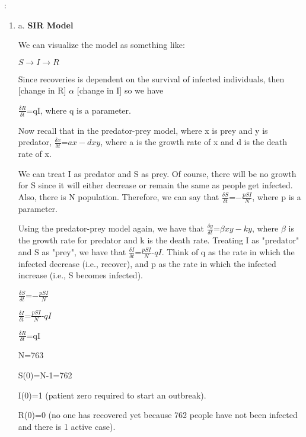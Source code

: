 \documentclass[12pt]{amsart}
\newcounter{probnum}
\newenvironment{prob}{\begin{enumerate}\setcounter{enumi}{\value{probnum}}}%
 {\setcounter{probnum}{\value{enumi}}\end{enumerate}}
\begin{document}
 :  

\begin{prob}
  
  \bigskip 
  
  \item[a.] {\bf SIR Model}
  
  \noindent We can visualize the model as something like:
  
  \noindent $S \rightarrow I \rightarrow R$
  
  \noindent Since recoveries is dependent on the survival of infected individuals, then [change in R] $\alpha$ [change in I] so  we have
  
  \noindent $\frac{\delta R}{\delta t}$=qI, where q is a parameter.
  
  \noindent Now recall that in the predator-prey model, where x is prey and y is predator, $\frac{\delta x}{\delta t}$=$ax-dxy$, where a is the growth rate of x and d is the death rate of x.
  
  \noindent We can treat I as predator and S as prey. Of course, there will be no growth for S since it will either decrease or remain the same as people get infected. Also, there is N population. Therefore, we can say that $\frac{\delta S}{\delta t}$=$-\frac{pSI}{N}$, where p is a parameter.
  
  \noindent Using the predator-prey model again, we have that $\frac{\delta y}{\delta t}$=$\beta xy-ky$, where $\beta$ is the growth rate for predator and k is the death rate. Treating  I as "predator" and S as "prey", we have that $\frac{\delta I}{\delta t}$=$\frac{pSI}{N}$-$qI$. Think of q as the rate in which the infected decrease (i.e., recover), and p as the rate in which the infected increase (i.e., S becomes infected).
  
  \bigskip
  
  \noindent $\frac{\delta S}{\delta t}$=$-\frac{pSI}{N}$
  
  \noindent $\frac{\delta I}{\delta t}$=$\frac{pSI}{N}$-$qI$
  
  \noindent $\frac{\delta R}{\delta t}$=qI
  
  \noindent N=763
  
  \noindent S(0)=N-1=762
  
  \noindent I(0)=1 (patient zero required to start an outbreak).
  
  \noindent R(0)=0 (no one has recovered yet because 762 people have not been infected and there is 1 active case).

\bigskip 


\end{prob}
\end{document}
